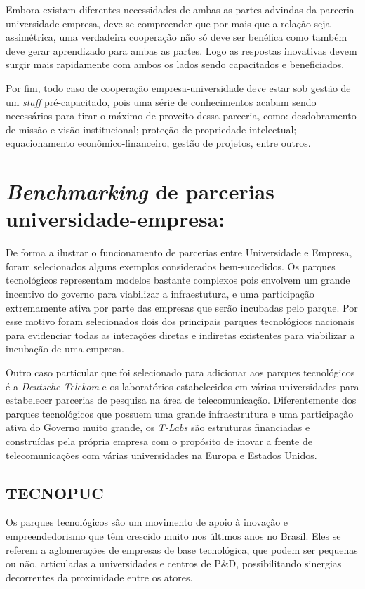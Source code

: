 Embora existam diferentes necessidades de ambas as partes advindas da parceria universidade-empresa, deve-se compreender que por mais que a relação seja assimétrica, uma verdadeira cooperação não só deve ser benéfica como também deve gerar aprendizado para ambas as partes. Logo as respostas inovativas devem surgir mais rapidamente com ambos os lados sendo capacitados e beneficiados.

Por fim, todo caso de cooperação empresa-universidade deve estar sob gestão de um \textit{staff} pré-capacitado, pois uma série de conhecimentos acabam sendo necessários para tirar o máximo de proveito dessa parceria, como: desdobramento de missão e visão institucional; proteção de propriedade intelectual; equacionamento econômico-financeiro, gestão de projetos, entre outros.

\section{\textit{Benchmarking} de parcerias universidade-empresa:} %
\label{sec:cases}

De forma a ilustrar o funcionamento de parcerias entre Universidade e Empresa, foram selecionados alguns exemplos considerados bem-sucedidos. Os parques tecnológicos representam modelos bastante complexos pois envolvem um grande incentivo do governo para viabilizar a infraestutura, e uma participação extremamente ativa por parte das empresas que serão incubadas pelo parque. Por esse motivo foram selecionados dois dos principais parques tecnológicos nacionais para evidenciar todas as interações diretas e indiretas existentes para viabilizar a incubação de uma empresa.

Outro caso particular que foi selecionado para adicionar aos parques tecnológicos é a \textit{Deutsche Telekom} e os laboratórios estabelecidos em várias universidades para estabelecer parcerias de pesquisa na área de telecomunicação. Diferentemente dos parques tecnológicos que possuem uma grande infraestrutura e uma participação ativa do Governo muito grande, os \textit{T-Labs} são estruturas financiadas e construídas pela própria empresa com o propósito de inovar a frente de telecomunicações com várias universidades na Europa e Estados Unidos.

\subsection{TECNOPUC}

Os parques tecnológicos são um movimento de apoio à inovação e empreendedorismo que têm crescido muito nos últimos anos no Brasil. Eles se referem a aglomerações de empresas de base tecnológica, que podem ser pequenas ou não, articuladas a universidades e centros de P\&D, possibilitando sinergias decorrentes da proximidade entre os atores. \cite{parquestecnologicos} 

